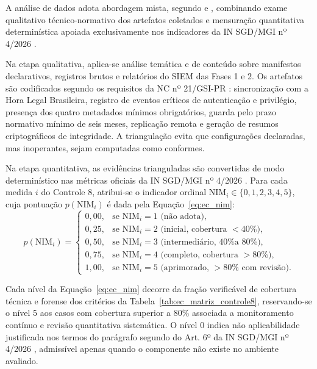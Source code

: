 A análise de dados adota abordagem mista, segundo  e , combinando exame qualitativo técnico-normativo dos artefatos coletados e mensuração quantitativa determinística apoiada exclusivamente nos indicadores da IN SGD/MGI nº 4/2026 \cite{in4_2026}.

Na etapa qualitativa, aplica-se análise temática e de conteúdo sobre manifestos declarativos, registros brutos e relatórios do SIEM das Fases 1 e 2. Os artefatos são codificados segundo os requisitos da NC nº 21/GSI-PR \cite{nc21_2014}: sincronização com a Hora Legal Brasileira, registro de eventos críticos de autenticação e privilégio, presença dos quatro metadados mínimos obrigatórios, guarda pelo prazo normativo mínimo de seis meses, replicação remota e geração de resumos criptográficos de integridade. A triangulação evita que configurações declaradas, mas inoperantes, sejam computadas como conformes.

Na etapa quantitativa, as evidências trianguladas são convertidas de modo determinístico nas métricas oficiais da IN SGD/MGI nº 4/2026 \cite{in4_2026}. Para cada medida $i$ do Controle 8, atribui-se o indicador ordinal $\mathrm{NIM}_i \in \{0, 1, 2, 3, 4, 5\}$, cuja pontuação $p(\mathrm{NIM}_i)$ é dada pela Equação~\ref{eq:ec_nim}:
\begin{equation}
\label{eq:ec_nim}
p(\mathrm{NIM}_i) = \left\{
\begin{array}{ll}
0{,}00, & \mbox{se } \mathrm{NIM}_i = 1 \mbox{ (não adota)}, \\
0{,}25, & \mbox{se } \mathrm{NIM}_i = 2 \mbox{ (inicial, cobertura } < 40\%), \\
0{,}50, & \mbox{se } \mathrm{NIM}_i = 3 \mbox{ (intermediário, 40\% a 80\%)}, \\
0{,}75, & \mbox{se } \mathrm{NIM}_i = 4 \mbox{ (completo, cobertura } > 80\%), \\
1{,}00, & \mbox{se } \mathrm{NIM}_i = 5 \mbox{ (aprimorado, } > 80\% \mbox{ com revisão)}.
\end{array}
\right.
\end{equation}

Cada nível da Equação~\ref{eq:ec_nim} decorre da fração verificável de cobertura técnica e forense dos critérios da Tabela~\ref{tab:ec_matriz_controle8}, reservando-se o nível 5 aos casos com cobertura superior a 80\% associada a monitoramento contínuo e revisão quantitativa sistemática. O nível 0 indica não aplicabilidade justificada nos termos do parágrafo segundo do Art. 6º da IN SGD/MGI nº 4/2026 \cite{in4_2026}, admissível apenas quando o componente não existe no ambiente avaliado.

